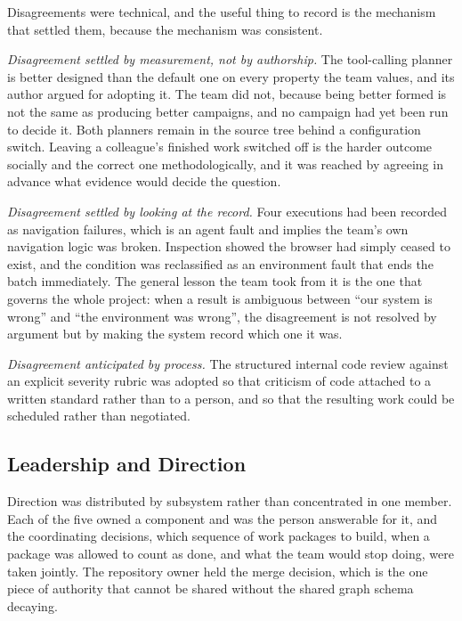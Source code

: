 Disagreements were technical, and the useful thing to record is the mechanism
that settled them, because the mechanism was consistent.

\emph{Disagreement settled by measurement, not by authorship.} The tool-calling
planner is better designed than the default one on every property the team
values, and its author argued for adopting it. The team did not, because being
better formed is not the same as producing better campaigns, and no campaign
had yet been run to decide it. Both planners remain in the source tree behind a
configuration switch. Leaving a colleague's finished work switched off is the
harder outcome socially and the correct one methodologically, and it was
reached by agreeing in advance what evidence would decide the question.

\emph{Disagreement settled by looking at the record.} Four executions had been
recorded as navigation failures, which is an agent fault and implies the
team's own navigation logic was broken. Inspection showed the browser had
simply ceased to exist, and the condition was reclassified as an environment
fault that ends the batch immediately. The general lesson the team took from it
is the one that governs the whole project: when a result is ambiguous between
``our system is wrong'' and ``the environment was wrong'', the disagreement is
not resolved by argument but by making the system record which one it was.

\emph{Disagreement anticipated by process.} The structured internal code review
against an explicit severity rubric was adopted so that criticism of code
attached to a written standard rather than to a person, and so that the
resulting work could be scheduled rather than negotiated.


\subsection{Leadership and Direction}
\label{sec:leadership}

Direction was distributed by subsystem rather than concentrated in one member.
Each of the five owned a component and was the person answerable for it, and
the coordinating decisions, which sequence of work packages to build, when a
package was allowed to count as done, and what the team would stop doing, were
taken jointly. The repository owner held the merge decision, which is the one
piece of authority that cannot be shared without the shared graph schema
decaying.

